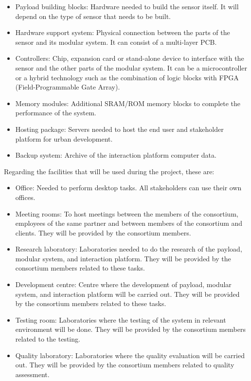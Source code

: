 \begin{itemize}
\item Payload building blocks: Hardware needed to build the sensor itself. It will depend on the type of sensor that needs to be built.
\item Hardware support system: Physical connection between the parts of the sensor and its modular system. It can consist of a multi-layer PCB.
\item Controllers: Chip, expansion card or stand-alone device to interface with the sensor and the other parts of the modular system. It can be a microcontroller or a hybrid technology such as the combination of logic blocks with FPGA (Field-Programmable Gate Array).
\item Memory modules: Additional SRAM/ROM memory blocks to complete the performance of the system.
\item Hosting package: Servers needed to host the end user and stakeholder platform for urban development.
\item Backup system: Archive of the interaction platform computer data. 
\end{itemize}

Regarding the facilities that will be used during the project, these are:

\begin{itemize}
\item Office: Needed to perform desktop tasks. All stakeholders can use their own offices.
\item Meeting rooms: To host meetings between the members of the consortium, employees of the same partner and between members of the consortium and clients. They will be provided by the consortium members. 
\item Research laboratory: Laboratories needed to do the research of the payload, modular system, and interaction platform. They will be provided by the consortium members related to these tasks. 
\item Development centre: Centre where the development of payload, modular system, and interaction platform will be carried out. They will be provided by the consortium members related to these tasks.
\item Testing room: Laboratories where the testing of the system in relevant environment will be done. They will be provided by the consortium members related to the testing.
\item Quality laboratory: Laboratories where the quality evaluation will be carried out. They will be provided by the consortium members related to quality assessment. 
\end{itemize}


